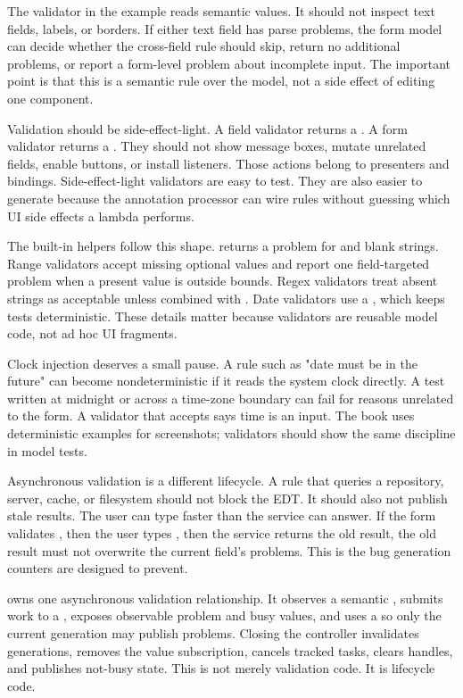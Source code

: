 The validator in the example reads semantic values. It should not inspect text
fields, labels, or borders. If either text field has parse problems, the form
model can decide whether the cross-field rule should skip, return no
additional problems, or report a form-level problem about incomplete input. The
important point is that this is a semantic rule over the model, not a side
effect of editing one component.

Validation should be side-effect-light. A field validator returns a
. A form validator returns a . They should not
show message boxes, mutate unrelated fields, enable buttons, or install
listeners. Those actions belong to presenters and bindings. Side-effect-light
validators are easy to test. They are also easier to generate because the
annotation processor can wire rules without guessing which UI side effects a
lambda performs.

The built-in  helpers follow this shape. 
returns a problem for  and blank strings. Range validators accept
missing optional values and report one field-targeted problem when a present
value is outside bounds. Regex validators treat absent strings as acceptable
unless combined with . Date validators use a , which
keeps tests deterministic. These details matter because validators are
reusable model code, not ad hoc UI fragments.

Clock injection deserves a small pause. A rule such as "date must be in the
future" can become nondeterministic if it reads the system clock directly. A
test written at midnight or across a time-zone boundary can fail for reasons
unrelated to the form. A validator that accepts  says time is an
input. The book uses deterministic examples for screenshots; validators should
show the same discipline in model tests.

Asynchronous validation is a different lifecycle. A rule that queries a
repository, server, cache, or filesystem should not block the EDT. It should
also not publish stale results. The user can type faster than the service can
answer. If the form validates , then the user types , then
the service returns the old  result, the old result must not overwrite
the current field's problems. This is the bug generation counters are designed
to prevent.

 owns one asynchronous validation relationship. It
observes a semantic , submits work to a ,
exposes observable problem and busy values, and uses a
 so only the current generation may publish problems.
Closing the controller invalidates generations, removes the value
subscription, cancels tracked tasks, clears handles, and publishes not-busy
state. This is not merely validation code. It is lifecycle code.

